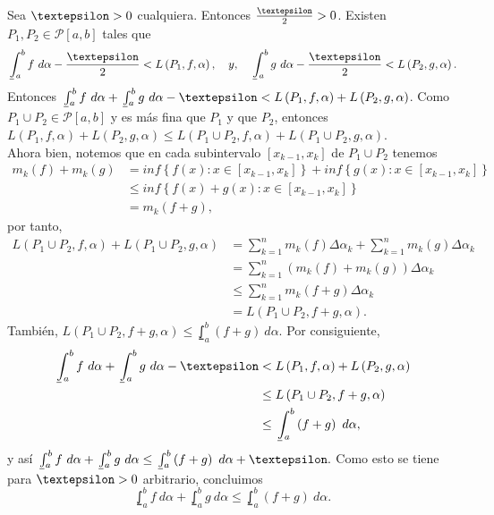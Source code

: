 Sea $\text{\textepsilon}>0$ cualquiera. Entonces $\frac{\text{\textepsilon}}{2}>0$. Existen $P_1,P_2\in\mathcal{P}\left[a,b\right]$ tales que
  \begin{equation*}
    \lowint_a^b f\ d\alpha - \frac{\text{\textepsilon}}{2} < L\left(P_1,f,\alpha\right),\quad y,\quad \lowint_a^b g\ d\alpha - \frac{\text{\textepsilon}}{2} < L\left(P_2,g,\alpha\right).
  \end{equation*}
  Entonces $\lowint_a^b f\ d\alpha + \lowint_a^b g\ d\alpha - \text{\textepsilon} < L\left(P_1,f,\alpha\right)+L\left(P_2,g,\alpha\right)$. Como $P_1\cup P_2 \in \mathcal{P}\left[a,b\right]$ y es más fina que $P_1$ y que $P_2$, entonces $L\left(P_1,f,\alpha\right)+L\left(P_2,g,\alpha\right) \leq L\left(P_1\cup P_2,f,\alpha\right)+L\left(P_1\cup P_2,g,\alpha\right)$.\\
  Ahora bien, notemos que en cada subintervalo $\left[x_{k-1},x_k\right]$ de $P_1\cup P_2$ tenemos
  \begin{align*}
    m_k\left(f\right)+m_k\left(g\right)&=inf\left\lbrace f\left(x\right): x\in\left[x_{k-1},x_k\right]\right\rbrace+inf\left\lbrace g\left(x\right): x\in\left[x_{k-1},x_k\right]\right\rbrace\\
    &\leq inf\left\lbrace f\left(x\right)+g\left(x\right): x\in\left[x_{k-1},x_k\right]\right\rbrace\\
    &=m_k\left(f+g\right),
  \end{align*}
por tanto,
\begin{align*}
  L\left(P_1\cup P_2, f, \alpha\right)+L\left(P_1\cup P_2, g, \alpha\right)&=\sum_{k=1}^{n} m_k\left(f\right)\Delta\alpha_k+\sum_{k=1}^{n} m_k\left(g\right)\Delta\alpha_k\\
  &=\sum_{k=1}^{n} \left(m_k\left(f\right)+m_k\left(g\right)\right)\Delta\alpha_k\\
  &\leq \sum_{k=1}^{n} m_k\left(f+g\right)\Delta\alpha_k\\
  &=L\left(P_1\cup P_2, f+g, \alpha\right).
\end{align*}
También, $L\left(P_1\cup P_2, f+g, \alpha\right)\leq \lowint_a^b\left(f+g\right)\ d\alpha$. Por consiguiente,
\begin{align*}
\lowint_a^b f\ d\alpha + \lowint_a^b g\ d\alpha - \text{\textepsilon} &< L\left(P_1,f,\alpha\right)+L\left(P_2,g,\alpha\right)\\
&\leq L\left(P_1\cup P_2, f+g, \alpha\right)\\
&\leq \lowint_a^b \left(f+g\right)\ d\alpha,
\end{align*}
y así $\lowint_a^b f\ d\alpha + \lowint_a^b g\ d\alpha \leq \lowint_a^b \left(f+g\right)\ d\alpha +  \text{\textepsilon}.$
Como esto se tiene para $\text{\textepsilon}>0$ arbitrario, concluimos
\begin{equation*}
\lowint_a^b f\ d\alpha + \lowint_a^b g\ d\alpha \leq \lowint_a^b \left(f+g\right)\ d\alpha.
\end{equation*}

